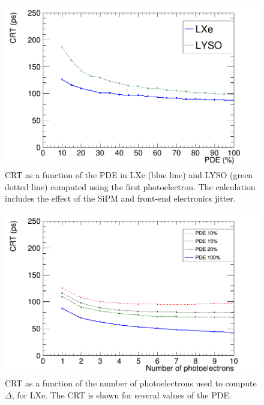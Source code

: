 \documentclass[review]{elsarticle}
\begin{document}
 \begin{figure}[!bhtp]
	\centering
	\includegraphics[scale=0.30]{../img/PetaloTOF/CTR_jitter_phys.png}
	\caption{\label{fig.crt3} CRT as a function of the PDE in LXe (blue line) and LYSO (green dotted line) computed using the first photoelectron. The calculation includes the effect of the SiPM  and front-end electronics jitter.}
\end{figure}

 \begin{figure}[!bhtp]
	\centering
	\includegraphics[scale=0.30]{../img/PetaloTOF/lxe_noCher_avg_npe_phys.png}
	\caption{\label{fig.crt_avg_LXe} CRT as a function of the number of photoelectrons used to compute $\Delta$, for LXe. The CRT is shown for several values of the PDE.}
\end{figure}
\end{document}
